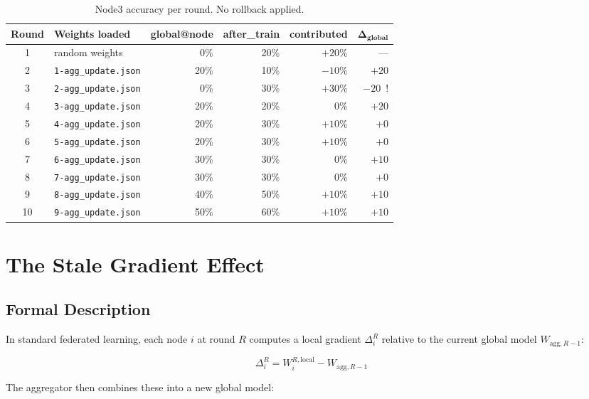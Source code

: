 \documentclass[11pt]{article}
\begin{document}
\begin{table}[H]
\centering
\begin{tabular}{clrrrr}
\toprule
\textbf{Round} & \textbf{Weights loaded} & \textbf{global@node} & \textbf{after\_train} & \textbf{contributed} & $\boldsymbol{\Delta_\text{global}}$ \\
\midrule
1  & random weights              & 0\%  & 20\% & $+20$\% & ---       \\
2  & \texttt{1-agg\_update.json} & 20\% & 10\% & $-10$\% & $+20$  \\
3  & \texttt{2-agg\_update.json} & 0\%  & 30\% & $+30$\% & $-20$~! \\
4  & \texttt{3-agg\_update.json} & 20\% & 20\% & $0$\%   & $+20$  \\
5  & \texttt{4-agg\_update.json} & 20\% & 30\% & $+10$\% & $+0$   \\
6  & \texttt{5-agg\_update.json} & 20\% & 30\% & $+10$\% & $+0$   \\
7  & \texttt{6-agg\_update.json} & 30\% & 30\% & $0$\%   & $+10$  \\
8  & \texttt{7-agg\_update.json} & 30\% & 30\% & $0$\%   & $+0$   \\
9  & \texttt{8-agg\_update.json} & 40\% & 50\% & $+10$\% & $+10$  \\
10 & \texttt{9-agg\_update.json} & 50\% & 60\% & $+10$\% & $+10$  \\
\bottomrule
\end{tabular}
\caption{Node3 accuracy per round. No rollback applied.}
\end{table}

\section{The Stale Gradient Effect}

\subsection{Formal Description}

In standard federated learning, each node $i$ at round $R$ computes a local gradient $\Delta_i^R$ relative to the current global model $W_{\text{agg},R-1}$:

\[
\Delta_i^R = W_i^{R,\text{local}} - W_{\text{agg},R-1}
\]

The aggregator then combines these into a new global model:
\end{document}
